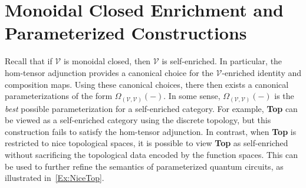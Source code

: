 \section{Monoidal Closed Enrichment and Parameterized Constructions}
%
\label{Sect:Closed}

Recall that if $\mathcal{V}$ is monoidal closed, then $\mathcal{V}$ is self-enriched.
In particular, the hom-tensor adjunction provides a canonical choice for the $\mathcal{V}$-enriched identity and composition maps.
Using these canonical choices, there then exists a canonical parameterizations of the form $\Omega_{(\mathcal{V},\mathcal{V})}( - )$.
In some sense, $\Omega_{(\mathcal{V},\mathcal{V})}( - )$ is the \emph{best} possible parameterization for a self-enriched category.
For example, \textbf{Top} can be viewed as a self-enriched category using the discrete topology, but this construction fails to satisfy the hom-tensor adjunction.
In contrast, when \textbf{Top} is restricted to nice topological spaces, it is possible to view \textbf{Top} as self-enriched without sacrificing the topological data encoded by the function spaces.
This can be used to further refine the semantics of parameterized quantum circuits, as illustrated in~\cref{Ex:NiceTop}.

